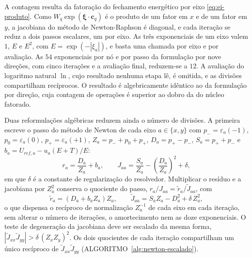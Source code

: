 A contagem resulta da fatoração do fechamento energético por eixo \eqref{eq:ei-produto}.
Como $W_q \exp(\boldsymbol{\xi}\cdot\mathbf{c}_q)$ é o produto de um fator em $x$ e de um fator em $y$, a jacobiana do método de Newton-Raphson é diagonal, e cada iteração se reduz a dois passos escalares, um por eixo.
As três exponenciais de um eixo valem $1$, $E$ e $E^2$, com $E = \exp(-|\xi_a|)$, e basta uma chamada por eixo e por avaliação.
As $54$ exponenciais por nó e por passo da formulação por nove direções, com cinco iterações e a avaliação final, reduzem-se a $12$.
A avaliação do logaritmo natural $\ln$, cujo resultado nenhuma etapa lê, é omitida, e as divisões compartilham recíprocos.
O resultado é algebricamente idêntico ao da formulação por direção, cuja contagem de operações é superior ao dobro da do núcleo fatorado. %

Duas reformulações algébricas reduzem ainda o número de divisões.
A primeira escreve o passo do método de Newton de cada eixo $a \in \{x, y\}$ com $p_- = \varepsilon_a(-1)$, $p_0 = \varepsilon_a(0)$, $p_+ = \varepsilon_a(+1)$, $Z_a = p_- + p_0 + p_+$, $D_a = p_+ - p_-$, $S_a = p_+ + p_-$ e $b_a = U_{ref,a} - u_a (E + T)/E$:
\begin{equation}
    r_a = \frac{D_a}{Z_a} + b_a, \qquad J_{aa} = \frac{S_a}{Z_a} - \left( \frac{D_a}{Z_a} \right)^{2} + \delta,
    \label{eq:newton-eixo}
\end{equation}
em que $\delta$ é a constante de regularização do resolvedor.
Multiplicar o resíduo e a jacobiana por $Z_a^2$ conserva o quociente do passo, $r_a / J_{aa} = \tilde r_a / \tilde J_{aa}$, com
\begin{equation}
    \tilde r_a = \left( D_a + b_a Z_a \right) Z_a, \qquad \tilde J_{aa} = S_a Z_a - D_a^{2} + \delta\, Z_a^{2},
    \label{eq:newton-escalado}
\end{equation}
o que dispensa o recíproco de normalização $Z_a^{-1}$ de cada eixo em cada iteração, sem alterar o número de iterações, o amortecimento nem as doze exponenciais.
O teste de degeneração da jacobiana deve ser escalado da mesma forma, $|\tilde J_{xx} \tilde J_{yy}| > \delta\, (Z_x Z_y)^2$.
Os dois quocientes de cada iteração compartilham um único recíproco de $\tilde J_{xx} \tilde J_{yy}$ (ALGORITMO~\ref{alg:newton-escalado}).

